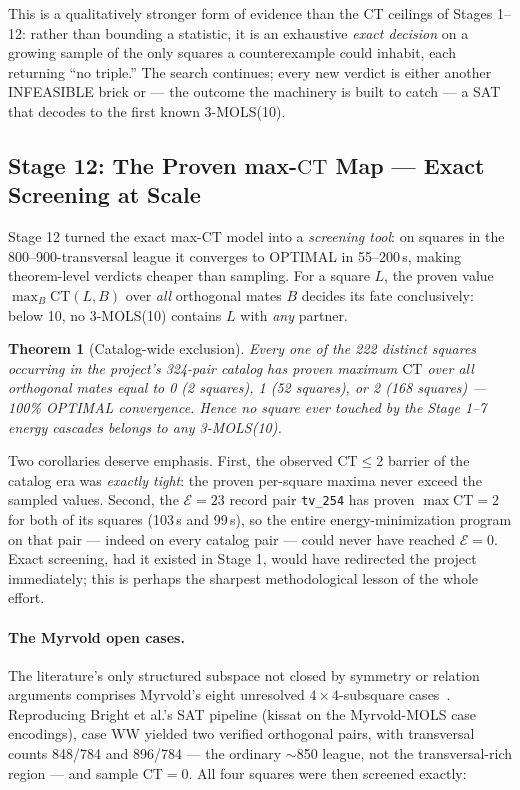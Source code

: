 \documentclass[11pt,a4paper]{article}
\newtheorem{theorem}{Theorem}[section]
\theoremstyle{remark}
\newcommand{\CT}{\mathrm{CT}}
\newcommand{\E}{\mathcal{E}}
\begin{document}
This is a qualitatively stronger form of evidence than the $\CT$ ceilings of
Stages 1--12: rather than bounding a statistic, it is an exhaustive
\emph{exact decision} on a growing sample of the only squares a counterexample
could inhabit, each returning ``no triple.'' The search continues; every new
verdict is either another INFEASIBLE brick or --- the outcome the machinery
is built to catch --- a SAT that decodes to the first known 3-MOLS(10).

\subsection{Stage 12: The Proven max-$\CT$ Map --- Exact Screening at Scale}
\label{sec:stage12}

Stage 12 turned the exact max-$\CT$ model into a \emph{screening tool}: on
squares in the 800--900-transversal league it converges to OPTIMAL in
55--200\,s, making theorem-level verdicts cheaper than sampling. For a
square $L$, the proven value $\max_B \CT(L,B)$ over \emph{all} orthogonal
mates $B$ decides its fate conclusively: below 10, no 3-MOLS(10) contains
$L$ with \emph{any} partner.

\begin{theorem}[Catalog-wide exclusion]\label{thm:catalogscreen}
Every one of the 222 distinct squares occurring in the project's 324-pair
catalog has proven maximum $\CT$ over all orthogonal mates equal to 0
(2 squares), 1 (52 squares), or 2 (168 squares) --- 100\% OPTIMAL
convergence. Hence no square ever touched by the Stage 1--7 energy
cascades belongs to any 3-MOLS(10).
\end{theorem}

Two corollaries deserve emphasis. First, the observed $\CT \leq 2$ barrier
of the catalog era was \emph{exactly tight}: the proven per-square maxima
never exceed the sampled values. Second, the $\E = 23$ record pair
\texttt{tv\_254} has proven $\max \CT = 2$ for both of its squares
(103\,s and 99\,s), so the entire energy-minimization program on that
pair --- indeed on every catalog pair --- could never have reached
$\E = 0$. Exact screening, had it existed in Stage 1, would have
redirected the project immediately; this is perhaps the sharpest
methodological lesson of the whole effort.

\paragraph{The Myrvold open cases.} The literature's only structured
subspace not closed by symmetry or relation arguments comprises
Myrvold's eight unresolved $4\times4$-subsquare cases~\cite{myrvold1999,
bright2025}. Reproducing Bright et al.'s SAT pipeline (kissat on the
Myrvold-MOLS case encodings), case WW yielded two verified orthogonal
pairs, with transversal counts 848/784 and 896/784 --- the ordinary
$\sim$850 league, not the transversal-rich region --- and sample
$\CT = 0$. All four squares were then screened exactly:
\end{document}
